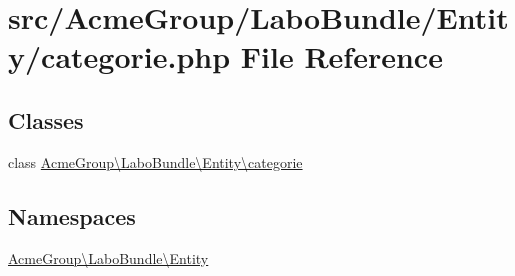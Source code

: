 \hypertarget{_labo_bundle_2_entity_2categorie_8php}{\section{src/\+Acme\+Group/\+Labo\+Bundle/\+Entity/categorie.php File Reference}
\label{_labo_bundle_2_entity_2categorie_8php}
}
\subsection*{Classes}
\begin{DoxyCompactItemize}
\item 
class \hyperlink{class_acme_group_1_1_labo_bundle_1_1_entity_1_1categorie}{Acme\+Group\textbackslash{}\+Labo\+Bundle\textbackslash{}\+Entity\textbackslash{}categorie}
\end{DoxyCompactItemize}
\subsection*{Namespaces}
\begin{DoxyCompactItemize}
\item 
 \hyperlink{namespace_acme_group_1_1_labo_bundle_1_1_entity}{Acme\+Group\textbackslash{}\+Labo\+Bundle\textbackslash{}\+Entity}
\end{DoxyCompactItemize}
